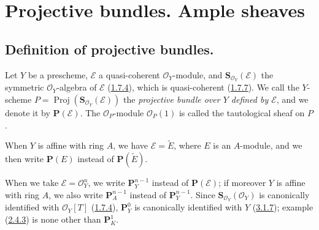 \section{Projective bundles. Ample sheaves}
\label{section:II.4}

\subsection{Definition of projective bundles.}
\label{subsection:II.4.1}

\begin{definition}[4.1.1]
\label{II.4.1.1}
Let $Y$ be a prescheme, $\mathcal{E}$ a quasi-coherent $\mathcal{O}_Y$-module,
and $\mathbf{S}_{\mathcal{O}_Y}(\mathcal{E})$ the symmetric
$\mathcal{O}_Y$-algebra of $\mathcal{E}$
(\hyperref[II.1.7.4]{1.7.4}), which is quasi-coherent
(\hyperref[II.1.7.7]{1.7.7}). We call the $Y$-scheme
$P=\operatorname{Proj}(\mathbf{S}_{\mathcal{O}_Y}(\mathcal{E}))$ the
\emph{projective bundle over $Y$ defined by $\mathcal{E}$}, and we denote it by
$\mathbf{P}(\mathcal{E})$. The
$\mathcal{O}_P$-module $\mathcal{O}_P(1)$ is called the tautological
sheaf on $P$.
\end{definition}

When $Y$ is affine with ring $A$, we have $\mathcal{E}=\widetilde{E}$, where
$E$ is an $A$-module, and we then write $\mathbf{P}(E)$ instead of
$\mathbf{P}(\widetilde{E})$.

When we take $\mathcal{E}=\mathcal{O}_Y^n$, we write
$\mathbf{P}_Y^{n-1}$ instead of $\mathbf{P}(\mathcal{E})$; if moreover $Y$
is affine with ring $A$, we also write $\mathbf{P}_A^{n-1}$ instead of
$\mathbf{P}_Y^{n-1}$. Since
$\mathbf{S}_{\mathcal{O}_Y}(\mathcal{O}_Y)$ is canonically identified with
$\mathcal{O}_Y[T]$ (\hyperref[II.1.7.4]{1.7.4}),
$\mathbf{P}_Y^0$ is canonically identified with $Y$
(\hyperref[II.3.1.7]{3.1.7}); example
(\hyperref[II.2.4.3]{2.4.3}) is none other than $\mathbf{P}_K^1$.

